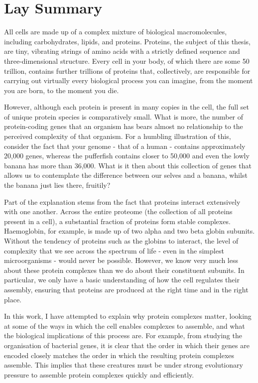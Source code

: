 \documentclass[a4paper,11pt,twoside,openright]{scrbook}
\begin{document}
\chapter*{Lay Summary}
All cells are made up of a complex mixture of biological macromolecules,
including carbohydrates, lipids, and proteins. Proteins, the subject of this
thesis, are tiny, vibrating strings of amino acids with a strictly defined
sequence and three-dimensional structure. Every cell in your body, of which
there are some 50 trillion, contains further trillions of proteins that,
collectively, are responsible for carrying out virtually every biological
process you can imagine, from the moment you are born, to the moment you die.

However, although each protein is present in many copies in the cell, the full
set of unique protein species is comparatively small. What is more, the number
of protein-coding genes that an organism has bears almost no relationship to the
perceived complexity of that organism. For a humbling illustration of this,
consider the fact that your genome - that of a human - contains approximately
20,000 genes, whereas the pufferfish contains closer to 50,000 and even the
lowly banana has more than 36,000. What is it then about this collection of
genes that allows us to contemplate the difference between our selves and a
banana, whilst the banana just lies there, fruitily?

Part of the explanation stems from the fact that proteins interact extensively
with one another. Across the entire proteome (the collection of all proteins
present in a cell), a substantial fraction of proteins form stable complexes.
Haemoglobin, for example, is made up of two alpha and two beta globin subunits.
Without the tendency of proteins such as the globins to interact, the level of
complexity that we see across the spectrum of life - even in the simplest
microorganisms - would never be possible. However, we know very much less about
these protein complexes than we do about their constituent subunits. In
particular, we only have a basic understanding of how the cell regulates their
assembly, ensuring that proteins are produced at the right time and in the right
place.

In this work, I have attempted to explain why protein complexes matter, looking
at some of the ways in which the cell enables complexes to assemble, and what
the biological implications of this process are. For example, from studying the
organisation of bacterial genes, it is clear that the order in which their genes
are encoded closely matches the order in which the resulting protein complexes
assemble. This implies that these creatures must be under strong evolutionary
pressure to assemble protein complexes quickly and efficiently.
\end{document}
